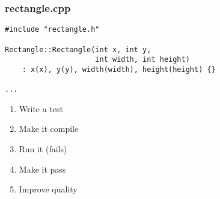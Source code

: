 \begin{frame}[fragile]
\frametitle{rectangle.cpp}
\begin{minipage}[t]{0.48\linewidth}
\begin{lstlisting}
#include "rectangle.h"

Rectangle::Rectangle(int x, int y, 
                     int width, int height)
    : x(x), y(y), width(width), height(height) {}

...
\end{lstlisting}
\end{minipage}\hfill
\begin{minipage}[t]{0.28\linewidth}
  \small
  \begin{enumerate} 
    \item \textcolor{deadcolor}{Write a test}
    \item \textcolor{deadcolor}{Make it compile}
    \item \textcolor{deadcolor}{Run it (fails)}
    \item \textcolor{activecolor}{Make it pass}
    \item \textcolor{deadcolor}{Improve quality}
  \end{enumerate} 
\end{minipage}
\end{frame}
